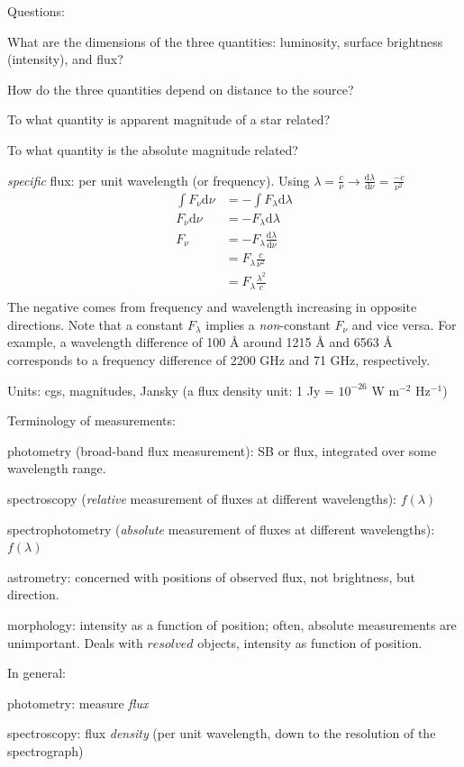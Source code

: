\documentclass[12pt]{article}
\begin{document}
Questions:
\begin{itemize*}
    \item What are the dimensions of the three quantities: luminosity,
        surface brightness (intensity), and flux?
    \item How do the three quantities depend on distance to the source?
    \item To what quantity is apparent magnitude of a star related?
    \item To what quantity is the absolute magnitude related?
\end{itemize*}
\emph{specific} flux: per unit wavelength (or frequency).
Using $\lambda=\frac{c}{\nu} \rightarrow
\frac{\textrm{d}\lambda}{\textrm{d}\nu} = \frac{-c}{\nu^2}$
\begin{align*}
    \int F_{\nu} \textrm{d} \nu &= -\int F_{\lambda} \textrm{d} \lambda\\
    F_{\nu} \textrm{d} \nu &= -F_{\lambda} \textrm{d} \lambda\\
    F_{\nu} &= -F_{\lambda} \frac{\textrm{d} \lambda}{\textrm{d}\nu}\\
    &= F_{\lambda} \frac{c}{\nu^2}\\
    &= F_{\lambda} \frac{\lambda^2}{c}\\
\end{align*}
The negative comes from frequency and wavelength increasing in
opposite directions.
Note that a constant $F_{\lambda}$ implies a \emph{non}-constant $F_{\nu}$
and vice versa. For example, a wavelength difference of 100 \AA{}
around 1215 \AA{} and 6563 \AA{} corresponds to a frequency difference
of 2200 GHz and 71 GHz, respectively.

Units: cgs, magnitudes, Jansky (a flux density unit:
1 Jy = $10^{-26}$ W m$^{-2}$ Hz$^{-1}$)

Terminology of measurements:
\begin{itemize*}
    \item photometry (broad-band flux measurement): SB or flux, integrated
        over some wavelength range.
    \item spectroscopy (\emph{relative} measurement of fluxes at
        different wavelengths):
        $f(\lambda)$
    \item spectrophotometry (\emph{absolute} measurement of fluxes at
        different wavelengths):
        $f(\lambda)$
    \item astrometry: concerned with positions of observed flux, not brightness,
        but direction.
    \item morphology: intensity as a function of position;
        often, absolute measurements are unimportant. Deals with $resolved$
        objects, intensity as function of position.
\end{itemize*}
In general:
\begin{itemize*}
    \item photometry: measure \emph{flux}
    \item spectroscopy: flux \emph{density} (per unit wavelength,
        down to the resolution of the spectrograph)
\end{itemize*}
\end{document}
